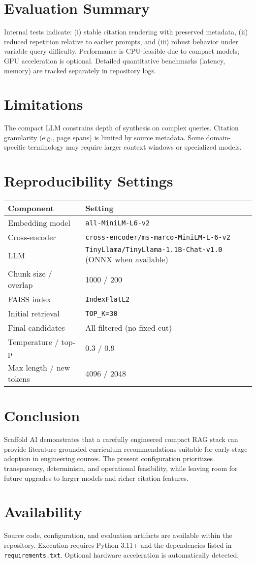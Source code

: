 \documentclass[11pt]{article}
\begin{document}
\section{Evaluation Summary}
Internal tests indicate: (i) stable citation rendering with preserved metadata, (ii) reduced repetition relative to earlier prompts, and (iii) robust behavior under variable query difficulty. Performance is CPU-feasible due to compact models; GPU acceleration is optional. Detailed quantitative benchmarks (latency, memory) are tracked separately in repository logs.

\section{Limitations}
The compact LLM constrains depth of synthesis on complex queries. Citation granularity (e.g., page spans) is limited by source metadata. Some domain-specific terminology may require larger context windows or specialized models.

\section{Reproducibility Settings}
\begin{longtable}{@{}ll@{}}
\toprule
Component & Setting \\
\midrule
Embedding model & \texttt{all-MiniLM-L6-v2} \\
Cross-encoder & \texttt{cross-encoder/ms-marco-MiniLM-L-6-v2} \\
LLM & \texttt{TinyLlama/TinyLlama-1.1B-Chat-v1.0} (ONNX when available) \\
Chunk size / overlap & 1000 / 200 \\
FAISS index & \texttt{IndexFlatL2} \\
Initial retrieval & \texttt{TOP\_K=30} \\
Final candidates & All filtered (no fixed cut) \\
Temperature / top-p & 0.3 / 0.9 \\
Max length / new tokens & 4096 / 2048 \\
\bottomrule
\end{longtable}

\section{Conclusion}
Scaffold AI demonstrates that a carefully engineered compact RAG stack can provide literature-grounded curriculum recommendations suitable for early-stage adoption in engineering courses. The present configuration prioritizes transparency, determinism, and operational feasibility, while leaving room for future upgrades to larger models and richer citation features.

\section*{Availability}
Source code, configuration, and evaluation artifacts are available within the repository. Execution requires Python 3.11+ and the dependencies listed in \texttt{requirements.txt}. Optional hardware acceleration is automatically detected.
\end{document}
